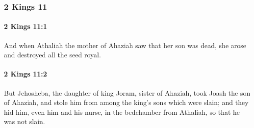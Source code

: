 	\subsubsection{2 Kings 11} %
		\label{2KINGS-11}

		\paragraph{2 Kings 11:1} %
			\label{2KINGS-11-1}

			And when Athaliah the mother of Ahaziah saw that her son was dead, she arose and destroyed all the seed royal.


		\paragraph{2 Kings 11:2} %
			\label{2KINGS-11-2}

			But Jehosheba, the daughter of king Joram, sister of Ahaziah, took Joash the son of Ahaziah, and stole him from among the king’s sons which were slain; and they hid him, even him and his nurse, in the bedchamber from Athaliah, so that he was not slain.

